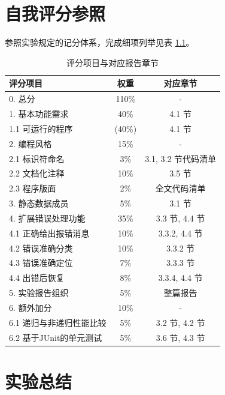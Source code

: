 \chapter{自我评分参照}
参照实验规定的记分体系，完成细项列举见表 \ref{tab:self-eval-map}。

\begin{table}[htbp]
    \centering
    \begin{tabular}{|p{5cm}|c|c|}
    \hline
    \textbf{评分项目} & \textbf{权重} & \textbf{对应章节} \\
    \hline
    0. 总分 & 110\% & - \\
    \hline
    1. 基本功能需求 & 40\% & 4.1 节 \\
    1.1 可运行的程序 & (40\%) & 4.1 节 \\
    \hline
    2. 编程风格 & 15\% & - \\
    2.1 标识符命名 & 3\% & 3.1, 3.2 节代码清单 \\
    2.2 文档化注释 & 10\% & 3.5 节 \\
    2.3 程序版面 & 2\% & 全文代码清单 \\
    \hline
    3. 静态数据成员 & 5\% & 3.1 节 \\
    \hline
    4. 扩展错误处理功能 & 35\% & 3.3 节, 4.4 节 \\
    4.1 正确给出报错消息 & 10\% & 3.3.2, 4.4 节 \\
    4.2 错误准确分类 & 10\% & 3.3.2 节 \\
    4.3 错误准确定位 & 7\% & 3.3.3 节 \\
    4.4 出错后恢复 & 8\% & 3.3.4, 4.4 节 \\
    \hline
    5. 实验报告组织 & 5\% & 整篇报告 \\
    \hline
    6. 额外加分 & 10\% & - \\
    6.1 递归与非递归性能比较 & 5\% & 3.2 节, 4.2 节 \\
    6.2 基于JUnit的单元测试 & 5\% & 3.6 节, 4.3 节 \\
    \hline
    \end{tabular}
    \caption{评分项目与对应报告章节}
    \label{tab:self-eval-map}
\end{table}

\chapter{实验总结}

